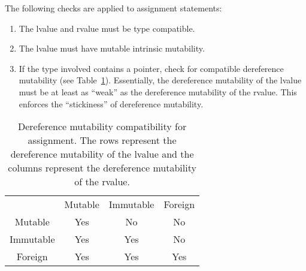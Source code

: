 
The following checks are applied to assignment statements:
\begin{enumerate}
\item The lvalue and rvalue must be type compatible.
\item The lvalue must have mutable intrinsic mutability.
\item If the type involved contains a pointer, check for compatible dereference mutability (see Table~\ref{assignmut}).
  Essentially, the dereference mutability of the lvalue must be at least as ``weak'' as the dereference mutability of the rvalue.
  This enforces the ``stickiness'' of dereference mutability.
\end{enumerate}


\begin{table}
  \centering
  \begin{tabular}{cccc}
              & Mutable & Immutable & Foreign \\
    Mutable   & Yes     & No        & No      \\
    Immutable & Yes     & Yes       & No      \\
    Foreign   & Yes     & Yes       & Yes     \\
    \end{tabular}
  \caption{Dereference mutability compatibility for assignment.  The rows represent the dereference mutability of the lvalue and the columns represent the dereference mutability of the rvalue.\label{assignmut}}
\end{table}

